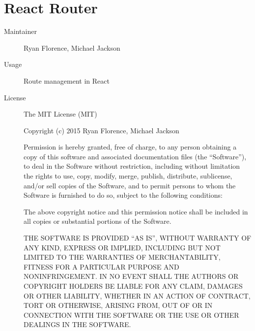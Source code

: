   \section*{React Router}
    \begin{description}
      \item[Maintainer] Ryan Florence, Michael Jackson
      \item[Usage] Route management in React
      \item[License] \scriptsize The MIT License (MIT)

        Copyright (c) 2015 Ryan Florence, Michael Jackson

        Permission is hereby granted, free of charge, to any person obtaining a copy of this software and associated documentation files (the ``Software''), to deal in the Software without restriction, including without limitation the rights to use, copy, modify, merge, publish, distribute, sublicense, and/or sell copies of the Software, and to permit persons to whom the Software is furnished to do so, subject to the following conditions:

        The above copyright notice and this permission notice shall be included in all copies or substantial portions of the Software.

        THE SOFTWARE IS PROVIDED ``AS IS'', WITHOUT WARRANTY OF ANY KIND, EXPRESS OR IMPLIED, INCLUDING BUT NOT LIMITED TO THE WARRANTIES OF MERCHANTABILITY, FITNESS FOR A PARTICULAR PURPOSE AND NONINFRINGEMENT. IN NO EVENT SHALL THE AUTHORS OR COPYRIGHT HOLDERS BE LIABLE FOR ANY CLAIM, DAMAGES OR OTHER LIABILITY, WHETHER IN AN ACTION OF CONTRACT, TORT OR OTHERWISE, ARISING FROM, OUT OF OR IN CONNECTION WITH THE SOFTWARE OR THE USE OR OTHER DEALINGS IN THE SOFTWARE.
    \end{description}

